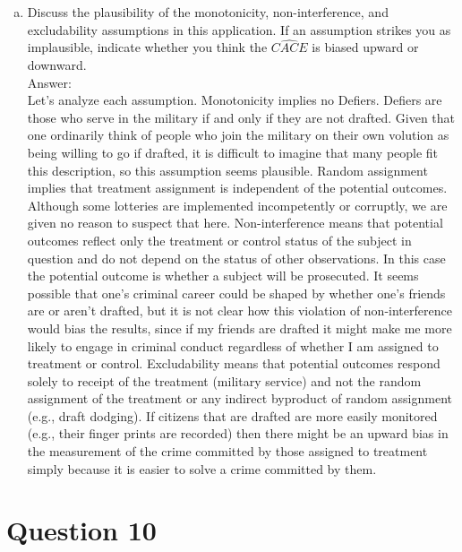 \documentclass[11pt,notitlepage]{article}\usepackage[]{graphicx}\usepackage[]{color}
\makeatletter
\newenvironment{kframe}{%
 \def\at@end@of@kframe{}%
 \ifinner\ifhmode%
  \def\at@end@of@kframe{\end{minipage}}%
  \begin{minipage}{\columnwidth}%
 \fi\fi%
 \def\FrameCommand##1{\hskip\@totalleftmargin \hskip-\fboxsep
 \colorbox{shadecolor}{##1}\hskip-\fboxsep
     \hskip-\linewidth \hskip-\@totalleftmargin \hskip\columnwidth}%
 \MakeFramed {\advance\hsize-\width
   \@totalleftmargin\z@ \linewidth\hsize
   \@setminipage}}%
 {\par\unskip\endMakeFramed%
 \at@end@of@kframe}
\newenvironment{knitrout}{}{} %
\makeatother
\begin{document}
\begin{enumerate}[a)]
\item Discuss the plausibility of the monotonicity, non-interference, and excludability assumptions in this application. If an assumption strikes you as implausible, indicate whether you think the $\widehat{CACE}$ is biased upward or downward. \\
Answer:\\
Let's analyze each assumption. Monotonicity implies no Defiers. Defiers are those who serve in the military if and only if they are not drafted. Given that one ordinarily think of people who join the military on their own volution as being willing to go if drafted, it is difficult to imagine that many people fit this description, so this assumption seems plausible. Random assignment implies that treatment assignment is independent of the potential outcomes. Although some lotteries are implemented incompetently or corruptly, we are given no reason to suspect that here. Non-interference means that potential outcomes reflect only the treatment or control status of the subject in question and do not depend on the status of other observations. In this case the potential outcome is whether a subject will be prosecuted. It seems possible that one's criminal career could be shaped by whether one's friends are or aren't drafted, but it is not clear how this violation of non-interference would bias the results, since if my friends are drafted it might make me more likely to engage in criminal conduct regardless of whether I am assigned to treatment or control. Excludability means that potential outcomes respond solely to receipt of the treatment (military service) and not the random assignment of the treatment or any indirect byproduct of random assignment (e.g., draft dodging). If citizens that are drafted are more easily monitored (e.g., their finger prints are recorded) then there might be an upward bias in the measurement of the crime committed by those assigned to treatment simply because it is easier to solve a crime committed by them. 
\end{enumerate}

\section*{Question 10}
\begin{knitrout}
\color{fgcolor}\begin{kframe}
\begin{verbatim}





\end{verbatim}
\end{kframe}
\end{knitrout}
\end{document}
